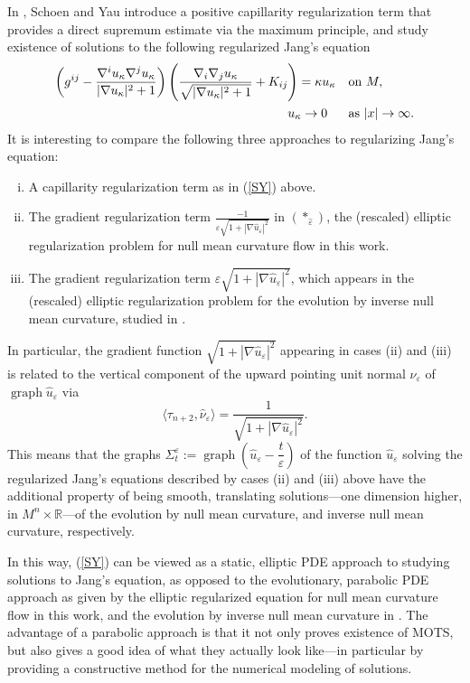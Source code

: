\documentclass[11pt]{amsart}
\renewcommand{\epsilon}{\varepsilon}
\DeclareMathOperator{\graph}{graph} \DeclareMathOperator{\closure}{Closure}
\def\e{\epsilon}
\def\k{\kappa}
\begin{document}
In \cite{SY81}, Schoen and Yau introduce a positive capillarity regularization term that provides a direct supremum estimate via the maximum principle, and study existence of solutions to the following regularized Jang's equation
\begin{align}
\label{SY}\left(g^{ij}-\dfrac{\nabla^iu_{\k}\nabla^ju_{\k}}{|\nabla u_{\k}|^2+1}\right)\left(\dfrac{\nabla_i\nabla_ju_{\k}}{\sqrt{|\nabla u_{\k}|^2+1}}+K_{ij}\right)=\k u_{\k}\quad&\text{on }M,\\
\notag u_{\k}\to0\quad\,\,\,\,&\text{as }|x|\to\infty.
\end{align}
It is interesting to compare the following three approaches to regularizing Jang's equation:
\begin{enumerate}[(i)]
\item A capillarity regularization term as in (\ref{SY}) above.
\item The gradient regularization term $\frac{-1}{\varepsilon\sqrt{1+|\nabla \hat{u}_{\varepsilon}|^2}}$ in $(*_{\hat{\varepsilon}})$, the (rescaled) elliptic regularization problem for null mean curvature flow in this work.
\item The gradient regularization term $\varepsilon\sqrt{1+|\nabla \hat{u}_{\varepsilon}|^2}$, which appears in the (rescaled) elliptic regularization problem 	for the evolution by inverse null mean curvature, studied in \cite{KM13}.
\end{enumerate} 

\noindent In particular, the gradient function $\sqrt{1+|\nabla \hat{u}_{\varepsilon}|^2}$ appearing in cases (ii) and (iii) is related to the vertical component of the upward pointing unit normal $\hat{\nu}_{\varepsilon}$ of $\graph\hat{u}_{\varepsilon}$ via 
\begin{equation}
\langle\tau_{n+2}, \hat{\nu}_{\varepsilon}\rangle=\frac{1}{\sqrt{1+|\nabla\hat{u}_{\varepsilon}|^2}}.
\end{equation} 
This means that the  graphs $\Sigma^{\varepsilon}_t:=\graph\left(\hat{u}_{\varepsilon}-\dfrac{t}{\varepsilon}\right)$ of the function $\hat u_\e$ solving the regularized Jang's equations described by cases (ii) and (iii) above have the additional property of being smooth, translating solutions---one dimension higher, in $M^n\times\mathbb{R}$---of the evolution by null mean curvature, and inverse null mean curvature, respectively.

 In this way, (\ref{SY}) can be viewed as a static, elliptic PDE approach to studying solutions to Jang's equation, as opposed to the evolutionary, parabolic PDE approach as given by the elliptic regularized equation for null mean curvature flow in this work, and the evolution by inverse null mean curvature in \cite{KM13}. The advantage of a parabolic approach is that it not only proves existence of MOTS, but also gives a good idea of what they actually look like---in particular by providing a constructive method for the numerical modeling of solutions.
\end{document}
